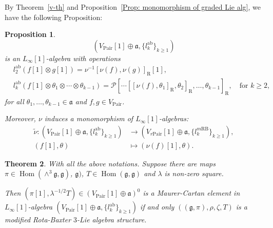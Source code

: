 \documentclass[12pt]{amsart}
\newtheorem{theorem}{Theorem}[section]
\newtheorem{prop}[theorem]{Proposition}
\theoremstyle{definition}
\begin{document}
By Theorem~\ref{v-th} and Proposition~\ref{Prop: monomorphism of graded Lie alg}, we have the following Proposition:
\begin{prop}
	\[
	\left( V_{\mathrm{Pair}}[1]\oplus \mathfrak{a}, \{l^{\mathrm{ab}}_k\}_{k \geq 1}\right)
	\]
	is an $L_\infty[1]$-algebra with operations
	\[
	\begin{aligned}
		& l^{\mathrm{ab}}_2(f[1] \otimes g[1]) = \nu^{-1}[\nu(f), \nu(g)]_{\mathrm{R}}[1], \\
		& l^{\mathrm{ab}}_k\left(f[1] \otimes \theta_1 \otimes \cdots \otimes \theta_{k-1} \right)
		= \mathcal{P} \left[ \cdots \left[ \left[ \nu(f), \theta_1 \right]_{\mathrm{R}}, \theta_2 \right]_{\mathrm{R}}, \ldots, \theta_{k-1} \right]_{\mathrm{R}}, \quad \text{for } k \geq 2,
	\end{aligned}
	\]
	for all $\theta_1, \ldots, \theta_{k-1} \in \mathfrak{a}$ and $f, g \in V_{\mathrm{Pair}}$.
	
	Moreover, $\nu$ induces a monomorphism of $L_\infty[1]$-algebras:
	\[
	\begin{aligned}
		\tilde{\nu}: \left( V_{\mathrm{Pair}}[1] \oplus \mathfrak{a}, \{l^{\mathrm{ab}}_k\}_{k \geq 1} \right)
		& \longrightarrow \left( V_{r\mathrm{Pair}}[1] \oplus \mathfrak{a}, \{l^{m\mathrm{RB}}_k\}_{k \geq 1} \right), \\
		(f[1], \theta) & \longmapsto (\nu(f)[1], \theta).
	\end{aligned}
	\]
	
\end{prop}

\begin{theorem}\label{Thm: MC of modified absolut RB}
	With all the above notations.     Suppose  there are maps $\pi\in \operatorname{Hom}(\wedge^3\mathfrak{g},\mathfrak{g})$,  $ \mathfrak{g})$, $T\in \operatorname{Hom}(  \mathfrak{g}  , \mathfrak{g})$ and $\lambda$ is non-zero square.
	
	Then $(\pi[1],\lambda^{-1/2}T)\in (V_{\mathrm{Pair}}[1] \oplus \mathfrak{a})^0$ is a  Maurer-Cartan element in $L_\infty[1]$-algebra $(V_{\mathrm{Pair}}[1] \oplus \mathfrak{a}, \{l^{\mathrm{ab}}_k\}_{k\geq 1} )$ if and only  $\left( \left(\mathfrak{g},\pi\right),\rho,\zeta,T\right) $  is   a  modified Rota-Baxter $3$-Lie algebra structure.
\end{theorem}
\end{document}
